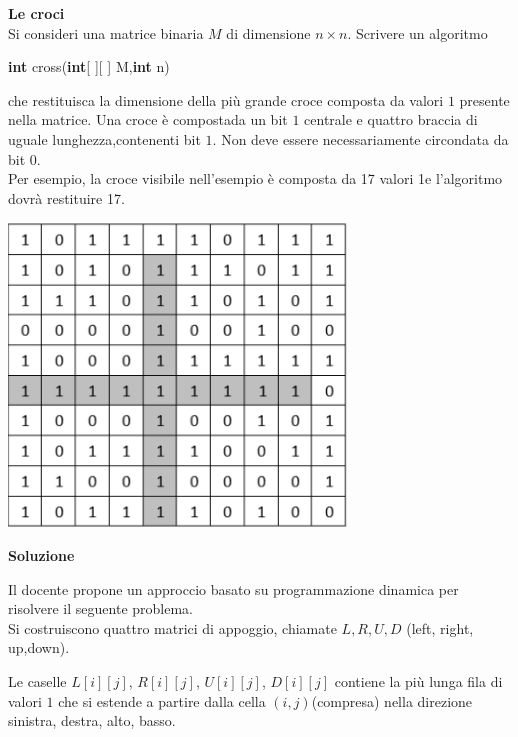 \documentclass[../cheatSheetAlgoritmi.tex]{subfiles}
\begin{document}
\textbf{Le croci}  \\
Si consideri una matrice binaria $M$ di dimensione $n \times n$. Scrivere un algoritmo
\begin{center}
\textbf{int} cross(\textbf{int}[ ][ ] M,\textbf{int} n)
\end{center}
che restituisca la dimensione della più grande croce composta da valori $1$ presente nella matrice. Una croce è compostada un bit $1$ centrale e quattro braccia di uguale lunghezza,contenenti bit $1$. Non deve essere necessariamente circondata da bit $0$. \\
Per esempio, la croce visibile nell’esempio è composta da 17 valori 1e l’algoritmo dovrà restituire 17.
\begin{center}
\includegraphics{../img/esame_07022019}
\end{center}
\textbf{Soluzione} 

Il docente propone un approccio basato su programmazione dinamica per risolvere il seguente problema. \\ Si costruiscono quattro matrici di appoggio, chiamate $L,R,U,D$ (left, right, up,down). 

Le caselle $L[i][j]$, $R[i][j]$, $U[i][j]$, $D[i][j]$ contiene la più lunga fila di valori $1$ che si estende a partire dalla cella $(i, j)$(compresa) nella direzione sinistra, destra, alto, basso. 
\end{document}
